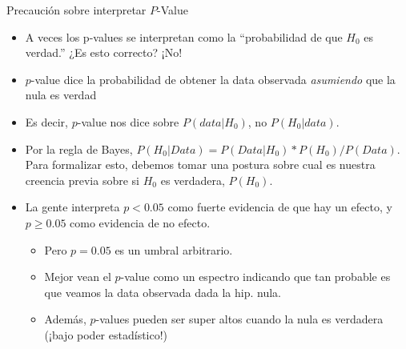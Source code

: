 \documentclass[11pt,handout,aspectratio=169]{beamer}
\newenvironment{wideitemize}{\itemize\addtolength{\itemsep}{10pt}}{\enditemize}
\begin{document}
\begin{frame}{Precaución sobre interpretar $P$-Value }

\begin{itemize}
\item A veces los p-values se interpretan como la ``probabilidad de que $H_0$ es verdad.'' ¿Es esto correcto? \pause{} ¡No!


\begin{wideitemize}
	\item $p$-value dice la probabilidad de obtener la data observada \emph{asumiendo} que la nula es verdad
	
	\item Es decir, $p$-value nos dice sobre $P(data | H_0)$, no $P(H_0 | data)$. 

	\item Por la regla de Bayes, $P(H_0 | Data) = P(Data | H_0) * P(H_0) / P(Data)$. Para formalizar esto, debemos tomar una postura sobre cual es nuestra creencia previa sobre si $H_0$ es verdadera, $P(H_0)$.
	
\end{wideitemize}


\pause
\bigskip
\item La gente interpreta $p<0.05$ como fuerte evidencia de que hay un efecto, y $p \geq 0.05$ como evidencia de no efecto. 

	\begin{itemize}
		\item 
		Pero $p=0.05$ es un umbral arbitrario. 
		\vspace{0.1cm}
		\item
		Mejor vean el $p$-value como un espectro indicando que tan probable es que veamos la data observada dada la hip. nula.
 \pause
		\vspace{0.1cm}
		\item
		Además, $p$-values pueden ser super altos cuando la nula es verdadera (¡bajo poder estadístico!)
	\end{itemize}
\end{itemize}

\end{frame}
\end{document}

